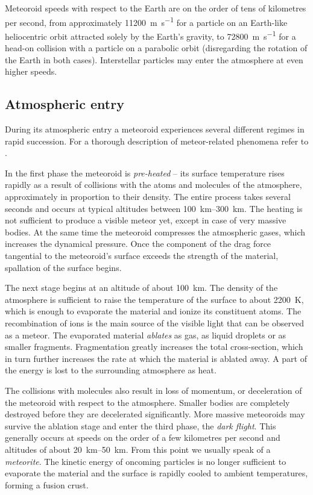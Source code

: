     Meteoroid speeds with respect to the Earth are on the order of tens of kilometres per second,
    from approximately \SI{11200}{\metre\per\second} for a particle on an Earth-like
    heliocentric orbit attracted solely by the Earth's gravity, to \SI{72800}{\metre\per\second}
    for a head-on collision with a particle on a parabolic orbit (disregarding the rotation of the Earth in both cases).
    Interstellar particles may enter the atmosphere at even higher speeds.

    \subsection{Atmospheric entry} \label{ile}
        During its atmospheric entry a meteoroid experiences several different regimes in rapid succession.
        For a thorough description of meteor-related phenomena refer to \citet{ceplecha+1998}.

        In the first phase the meteoroid is \emph{pre-heated} -- its surface temperature rises rapidly
        as a result of collisions with the atoms and molecules of the atmosphere,
        approximately in proportion to their density.
        The entire process takes several seconds and occurs at typical altitudes
        between \SIrange{100}{300}{\kilo\metre}. The heating is not sufficient to produce a visible meteor yet,
        except in case of very massive bodies. At the same time the meteoroid compresses
        the atmospheric gases, which increases the dynamical pressure. Once the component
        of the drag force tangential to the meteoroid's surface exceeds the strength of the material,
        spallation of the surface begins.

        The next stage begins at an altitude of about \SI{100}{\kilo\metre}.
        The density of the atmosphere is sufficient to raise the temperature of the surface
        to about \SI{2200}{\kelvin}, which is enough to evaporate the material and ionize its constituent atoms.
        The recombination of ions is the main source of the visible light that can be observed as a meteor.
        The evaporated material \emph{ablates} as gas, as liquid droplets or as smaller fragments.
        Fragmentation greatly increases the total cross-section, which in turn
        further increases the rate at which the material is ablated away.
        A part of the energy is lost to the surrounding atmosphere as heat.

        The collisions with molecules also result in loss of momentum, or deceleration of the meteoroid with respect to the atmosphere.
        Smaller bodies are completely destroyed before they are decelerated significantly.
        More massive meteoroids may survive the ablation stage and enter the third phase, the \emph{dark flight}.
        This generally occurs at speeds on the order of a few kilometres per second and altitudes of about \SIrange{20}{50}{\kilo\metre}.
        From this point we usually speak of a \emph{meteorite}.
        The kinetic energy of oncoming particles is no longer sufficient to evaporate the material
        and the surface is rapidly cooled to ambient temperatures, forming a fusion crust.

